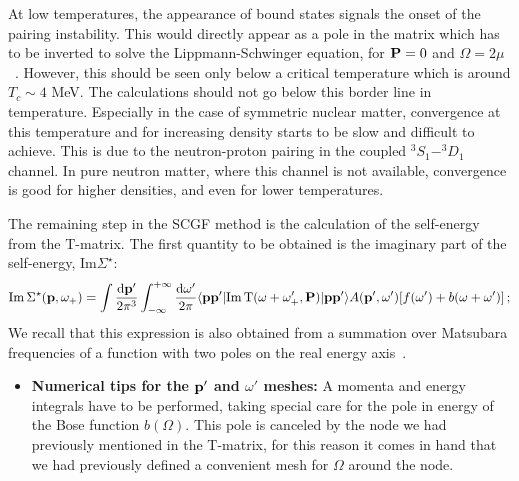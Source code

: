 At low temperatures, the appearance of bound states signals the onset of the pairing instability. This would directly appear as a pole in the matrix which has to be inverted to solve the Lippmann-Schwinger equation, for ${\bf P}=0$ and $\Omega=2\mu$~\cite{ch11_Thouless1960}. However, this should be seen only below a critical temperature which is around $T_c\sim4$ MeV. The calculations should not go below this border line in temperature. Especially in the case of symmetric nuclear matter, convergence at this temperature and for increasing density starts to be slow and difficult to achieve. This is due to the neutron-proton pairing in the coupled $^3S_1-^3D_1$ channel. In pure neutron matter, where this channel is not available, convergence is good for higher densities, and even for lower temperatures. 

 The remaining step in the SCGF method is the calculation of the self-energy from the T-matrix. The first quantity to be obtained is the imaginary part of the self-energy, Im$\Sigma^\star$:
\begin{equation}
{\rm Im} \, \Sigma^\star({\bf p},\omega_+)=\int\frac{{\rm d}{\bf p'}}{2\pi^3}\int_{-\infty}^{+\infty}\frac{{\rm d}{\omega'}}{2\pi}\langle{\bf pp'}|{\rm Im} \, {\rm T}(\omega+\omega'_+,{\bf P})|{\bf pp'}\rangle A({\bf p'},\omega')[f(\omega')+b(\omega+\omega')]\,;
\end{equation}
We recall that this expression is also obtained from a summation over Matsubara frequencies of a function with two poles on the real energy axis~\cite{ch11_Rios2007PhD}. 
\begin{itemize}
\item {\bf Numerical tips for the ${\bf p'}$  and $\omega'$ meshes:} A momenta and energy integrals have to be performed, taking special care for the pole in energy of the Bose function $b(\Omega)$. This pole is canceled by the node we had previously mentioned in the T-matrix, for this reason it comes in hand that we had previously defined a convenient mesh for $\Omega$ around the node. 
\end{itemize}
 
